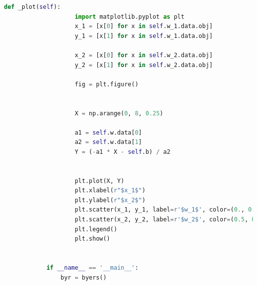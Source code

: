 \documentclass[UTF8,a4paper]{ctexart}
\begin{document}
\begin{itemize}
\begin{lstlisting}[language={Python}]
                def _plot(self):
                    import matplotlib.pyplot as plt
                    x_1 = [x[0] for x in self.w_1.data.obj]
                    y_1 = [x[1] for x in self.w_1.data.obj]
            
                    x_2 = [x[0] for x in self.w_2.data.obj]
                    y_2 = [x[1] for x in self.w_2.data.obj]
            
                    fig = plt.figure()
            

                    X = np.arange(0, 8, 0.25)
            
                    a1 = self.w.data[0]
                    a2 = self.w.data[1]
                    Y = (-a1 * X - self.b) / a2
            

                    plt.plot(X, Y)
                    plt.xlabel(r"$x_1$")
                    plt.ylabel(r"$x_2$")
                    plt.scatter(x_1, y_1, label=r'$w_1$', color=(0., 0.5, 0.))
                    plt.scatter(x_2, y_2, label=r'$w_2$', color=(0.5, 0., 0.))
                    plt.legend()
                    plt.show()
            
            
            if __name__ == '__main__':
                byr = byers()
            
            \end{lstlisting}

\end{itemize}
\end{document}
